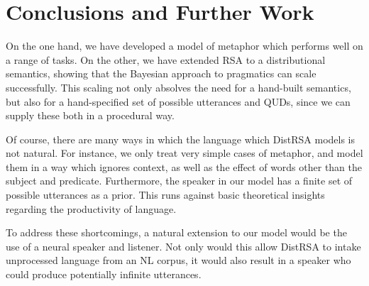 \documentclass[10pt,letterpaper,twocolumn]{article}
\begin{document}
\section{Conclusions and Further Work}

On the one hand, we have developed a model of metaphor which performs well on a range of tasks. On the other, we have extended RSA to a distributional semantics, showing that the Bayesian approach to pragmatics can scale successfully. This scaling not only absolves the need for a hand-built semantics, but also for a hand-specified set of possible utterances and QUDs, since we can supply these both in a procedural way.

Of course, there are many ways in which the language which DistRSA models is not natural. For instance, we only treat very simple cases of metaphor, and model them in a way which ignores context, as well as the effect of words other than the subject and predicate. Furthermore, the speaker in our model has a finite set of possible utterances as a prior. This runs against basic theoretical insights regarding the productivity of language.

To address these shortcomings, a natural extension to our model would be the use of a neural speaker and listener. Not only would this allow DistRSA to intake unprocessed language from an NL corpus, it would also result in a speaker who could produce potentially infinite utterances. 

\printbibliography
\end{document}
